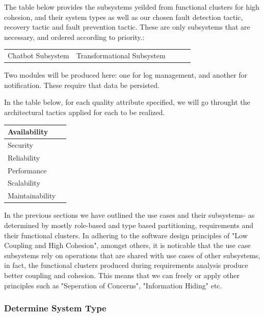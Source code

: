 \documentclass[11pt]{article}
\begin{document}
The table below provides the subsystems yeilded from functional clusters for high cohesion, and their system types as well as our chosen fault detection tactic, recovery tactic and fault prevention tactic. These are only subsystems that are necessary, and ordered according to priority.:

\begin{center}
	\begin{tabular}{|c|c|c|c|c|}
		\hline
		Chatbot Subsystem & Transformational Subsystem & 
		\hline
	\end{tabular}	
\end{center}


Two modules will be produced here: one for log management, and another for notification. These require that data be persisted.

In the table below, for each quality attribute specified, we will go throught the architectural tactics applied for each to be realized.

\begin{center}
	\begin{tabular}{|p{3cm}|p{7cm}|}
	\hline
	Availability & \\
	\hline
	Security & \\
	\hline
	Reliability & \\
	\hline
	Performance & \\
	\hline
	Scalability & \\
	\hline
	Maintainability & \\
	\hline
	\end{tabular}
\end{center}

In the previous sections we have outlined the use cases and their subsystems- as determined by mostly role-based and type based partitioning, requirements and their functional clusters. In adhering to the software design principles of "Low Coupling and High Cohesion", amongst others, it is noticable that the use case subsystems rely on operations that are shared with use cases of other subsystems, in fact, the functional clusters produced during requirements analysis produce better coupling and cohesion. This means that we can freely or apply other principles such as "Seperation of Concerns", "Information Hiding" etc.

\subsubsection{Determine System Type}
\end{document}
